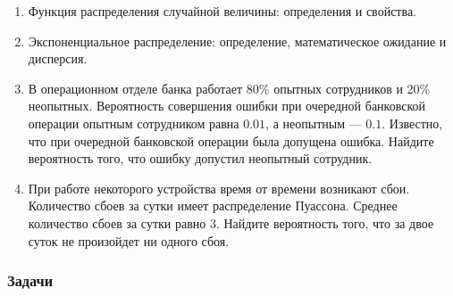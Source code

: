 \begin{enumerate}
\item Функция распределения случайной величины: определения и свойства.
\item Экспоненциальное распределение: определение, математическое ожидание и дисперсия.
\item В операционном отделе банка работает 80\% опытных сотрудников и 20\% неопытных. Вероятность совершения ошибки при очередной банковской операции опытным сотрудником равна $0.01$, а неопытным — $0.1$. Известно, что при очередной банковской операции была допущена ошибка. Найдите вероятность того, что ошибку допустил неопытный сотрудник.
\item При работе некоторого устройства время от времени возникают сбои. Количество сбоев за сутки имеет распределение Пуассона. Среднее количество сбоев за сутки равно 3. Найдите вероятность того, что за двое суток не произойдет ни одного сбоя.

\end{enumerate}

\subsubsection*{Задачи}

